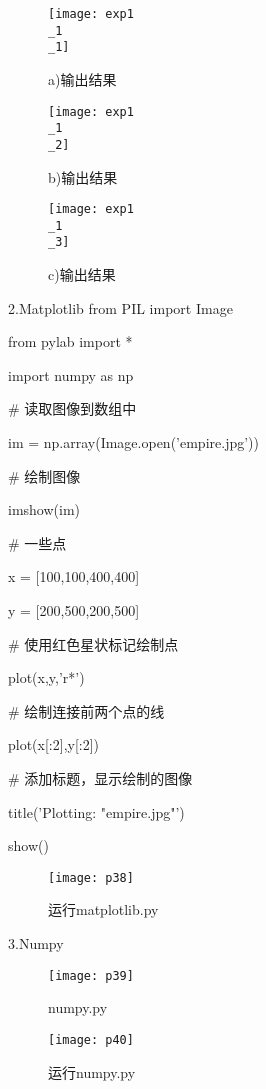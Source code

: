\documentclass[a4paper ,12pt]{article}
\begin{document}
    \begin{figure}[h]
    	\centering
    	\texttt{[image: exp1\\\_1\\\_1]}
    	\caption{a)输出结果}
    \end{figure}
    
    \begin{figure}[h]
    	\centering
    	\texttt{[image: exp1\\\_1\\\_2]}
    	\caption{b)输出结果}
    \end{figure}
    
     \begin{figure}[h]
    	\centering
    	\texttt{[image: exp1\\\_1\\\_3]}
    	\caption{c)输出结果}
    \end{figure}
    
	 2.Matplotlib 
	 from PIL import Image
	 
	 from pylab import *
	 
	 import numpy as np
	 
	 \# 读取图像到数组中
	 
	 im = np.array(Image.open('empire.jpg'))
	 
	 \# 绘制图像
	 
	 imshow(im)
	 
	 \# 一些点
	 
	 x = [100,100,400,400]
	 
	 y = [200,500,200,500]
	 
	 \# 使用红色星状标记绘制点
	 
	 plot(x,y,'r*')
	 
	 \# 绘制连接前两个点的线
	 
	 plot(x[:2],y[:2])
	 
	 \# 添加标题，显示绘制的图像
	 
	 title('Plotting: "empire.jpg"')
	 
	 show()
	 
	 \begin{figure}[h]
	 	\centering
	 	\texttt{[image: p38]}
	 	\caption{运行matplotlib.py}
	 \end{figure}
	
	3.Numpy
	  \begin{figure}[h]
	 	\centering
	 	\texttt{[image: p39]}
	 	\caption{numpy.py}
	 \end{figure}
	 
	  \begin{figure}[h]
	 	\centering
	 	\texttt{[image: p40]}
	 	\caption{运行numpy.py}
	 \end{figure}
	 
\end{document}

